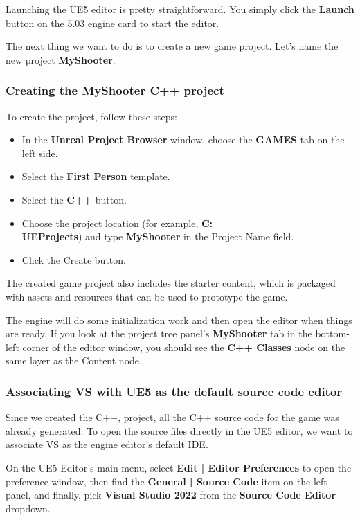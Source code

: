 \documentclass[11pt]{article} %
\begin{document}
Launching the UE5 editor is pretty straightforward. You simply click the \textbf{Launch} button on the 5.03 engine card to start the editor.

The next thing we want to do is to create a new game project. Let’s name the new project \textbf{MyShooter}.

\subsubsection*{Creating the MyShooter C++ project}

To create the project, follow these steps:

\begin{itemize}
\item In the \textbf{Unreal Project Browser} window, choose the \textbf{GAMES} tab on the left side.
\item Select the \textbf{First Person} template.
\item Select the \textbf{C++} button.
\item Choose the project location (for example, \textbf{C:\\UEProjects}) and type \textbf{MyShooter} in the Project Name field.
\item Click the Create button.
\end{itemize}

The created game project also includes the starter content, which is packaged with assets and resources that can be used to prototype the game.

The engine will do some initialization work and then open the editor when things are ready. If you look at the project tree panel’s \textbf{MyShooter} tab in the bottom-left corner of the editor window, you should see the \textbf{C++ Classes} node on the same layer as the Content node.

\subsubsection*{Associating VS with UE5 as the default source code editor}

Since we created the C++, project, all the C++ source code for the game was already generated. To open the source files directly in the UE5 editor, we want to associate VS as the engine editor’s default IDE.

On the UE5 Editor’s main menu, select \textbf{Edit | Editor Preferences} to open the preference window, then find the \textbf{General | Source Code} item on the left panel, and finally, pick \textbf{Visual Studio 2022} from the \textbf{Source Code Editor} dropdown.
\end{document}
